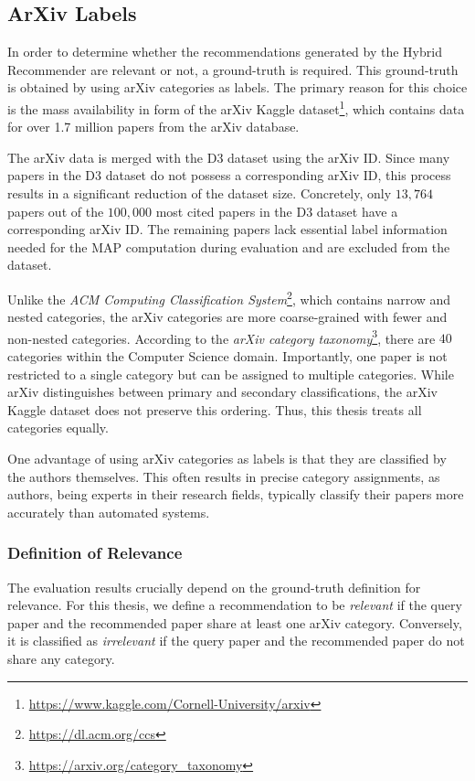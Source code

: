 \subsection{ArXiv Labels} \label{sec:arxiv-labels}

In order to determine whether the recommendations generated by the Hybrid Recommender are relevant or not, a ground-truth is required.
This ground-truth is obtained by using arXiv categories as labels. The primary reason for this choice is the mass availability in form of the arXiv Kaggle dataset\footnote{\url{https://www.kaggle.com/Cornell-University/arxiv}}, which contains data for over 1.7 million papers from the arXiv database.

The arXiv data is merged with the D3 dataset using the arXiv ID.
Since many papers in the D3 dataset do not possess a corresponding arXiv ID, this process results in a significant reduction of the dataset size.
Concretely, only $13,764$ papers out of the $100,000$ most cited papers in the D3 dataset have a corresponding arXiv ID.
The remaining papers lack essential label information needed for the \ac{MAP} computation during evaluation and are excluded from the dataset.

Unlike the \emph{ACM Computing Classification System}\footnote{\url{https://dl.acm.org/ccs}}, which contains narrow and nested categories, the arXiv categories are more coarse-grained with fewer and non-nested categories.
According to the \emph{arXiv category taxonomy}\footnote{\url{https://arxiv.org/category_taxonomy}}, there are $40$ categories within the Computer Science domain. Importantly, one paper is not restricted to a single category but can be assigned to multiple categories.
While arXiv distinguishes between primary and secondary classifications, the arXiv Kaggle dataset does not preserve this ordering. Thus, this thesis treats all categories equally.

One advantage of using arXiv categories as labels is that they are classified by the authors themselves.
This often results in precise category assignments, as authors, being experts in their research fields, typically classify their papers more accurately than automated systems.


\subsubsection*{Definition of Relevance}

The evaluation results crucially depend on the ground-truth definition for relevance.
For this thesis, we define a recommendation to be \emph{relevant} if the query paper and the recommended paper share at least one arXiv category. Conversely, it is classified as \emph{irrelevant} if the query paper and the recommended paper do not share any category.

